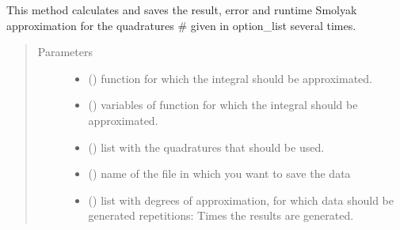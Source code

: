 \documentclass[letterpaper,10pt,english]{sphinxmanual}
\begin{document}
\begin{fulllineitems}
\label{\detokenize{index:Studienprojekt_Smolyak_qmc_one_point.calculate_stat_data}}
This method calculates and saves the result, error and runtime Smolyak approximation for the quadratures
\# given in option\_list several times.
\begin{quote}\begin{description}
\item[{Parameters}] \leavevmode\begin{itemize}
\item {} 
 () \textendash{} function for which the integral should be approximated.

\item {} 
 () \textendash{} variables of function for which the integral should be approximated.

\item {} 
 () \textendash{} list with the quadratures that should be used.

\item {} 
 () \textendash{} name of the file in which you want to save the data

\item {} 
 () \textendash{} list with degrees of approximation, for which data should be generated
repetitions: Times the results  are generated.


\end{itemize}
\end{description}
\end{quote}
\end{fulllineitems}
\end{document}
